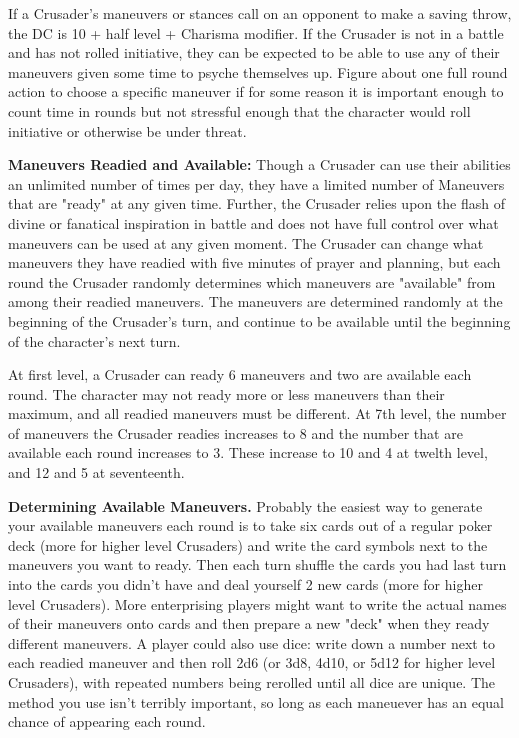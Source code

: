 If a Crusader's maneuvers or stances call on an opponent to make a saving throw, the DC is 10 + half level + Charisma modifier. If the Crusader is not in a battle and has not rolled initiative, they can be expected to be able to use any of their maneuvers given some time to psyche themselves up. Figure about one full round action to choose a specific maneuver if for some reason it is important enough to count time in rounds but not stressful enough that the character would roll initiative or otherwise be under threat.

\textbf{Maneuvers Readied and Available:} Though a Crusader can use their abilities an unlimited number of times per day, they have a limited number of Maneuvers that are "ready" at any given time. Further, the Crusader relies upon the flash of divine or fanatical inspiration in battle and does not have full control over what maneuvers can be used at any given moment. The Crusader can change what maneuvers they have readied with five minutes of prayer and planning, but each round the Crusader randomly determines which maneuvers are "available" from among their readied maneuvers. The maneuvers are determined randomly at the beginning of the Crusader's turn, and continue to be available until the beginning of the character's next turn.

At first level, a Crusader can ready 6 maneuvers and two are available each round. The character may not ready more or less maneuvers than their maximum, and all readied maneuvers must be different. At 7th level, the number of maneuvers the Crusader readies increases to 8 and the number that are available each round increases to 3. These increase to 10 and 4 at twelth level, and 12 and 5 at seventeenth.

\textbf{Determining Available Maneuvers.} Probably the easiest way to generate your available maneuvers each round is to take six cards out of a regular poker deck (more for higher level Crusaders) and write the card symbols next to the maneuvers you want to ready. Then each turn shuffle the cards you had last turn into the cards you didn't have and deal yourself 2 new cards (more for higher level Crusaders). More enterprising players might want to write the actual names of their maneuvers onto cards and then prepare a new "deck" when they ready different maneuvers. A player could also use dice: write down a number next to each readied maneuver and then roll 2d6 (or 3d8, 4d10, or 5d12 for higher level Crusaders), with repeated numbers being rerolled until all dice are unique. The method you use isn't terribly important, so long as each maneuever has an equal chance of appearing each round.

